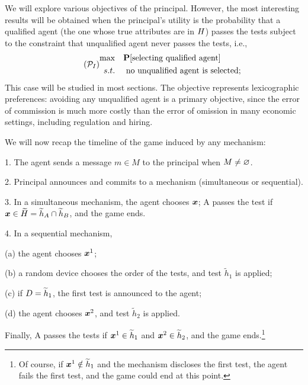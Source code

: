 We will explore various objectives of the principal. However, the most
interesting results will be obtained when the principal's utility is the
probability that a qualified agent (the one whose true attributes are in $H$)
passes the tests subject to the constraint that unqualified agent never
passes the tests, i.e.,
\begin{equation}\tag{$\mathcal{P}_{I}$}\label{max qualified}
    \begin{aligned}
        \max & \quad \pr[\text{selecting qualified agent}] \\
        s.t. & \quad \text{ no unqualified agent is selected};\\
    \end{aligned}
\end{equation}
This case will be studied in most  sections. The objective represents lexicographic preferences:  avoiding any unqualified agent is a primary objective, since the error of commission is much more costly than the error of omission in many economic settings, including regulation and hiring.

We will now recap the timeline of the game induced by any mechanism:

1. The agent sends a message $m\in M$ to the principal when $M\neq\varnothing$.

2. Principal announces and commits to a mechanism (simultaneous or
sequential).

3. In a simultaneous mechanism, the agent chooses $\boldsymbol{x}$; A passes the test if $\boldsymbol{x}\in \widetilde{H}=\widetilde{h}_{A}\cap \widetilde{h}_{B}$, and the game ends.

4. In a sequential mechanism, 

(a) the agent chooses $\boldsymbol{x}^1$;

(b) a random device chooses the order of the tests, and test $\widetilde h_{1}$ is
applied; 

(c) if $D=\widetilde{h}_{1}$, the first test is announced to the agent;

(d) the agent chooses $\boldsymbol{x}^2$, and test $\widetilde h_{2}$ is applied.

Finally, A passes the tests if $\boldsymbol{x}^1\in \widetilde h_{1}$ and $\boldsymbol{x}^2\in \widetilde h_{2}$, and the game ends.\footnote{%
Of course, if $\boldsymbol{x}^1\notin \widetilde h_{1}$ and the mechanism discloses the first test, the agent fails the first test, and the
game could end at this point.}

